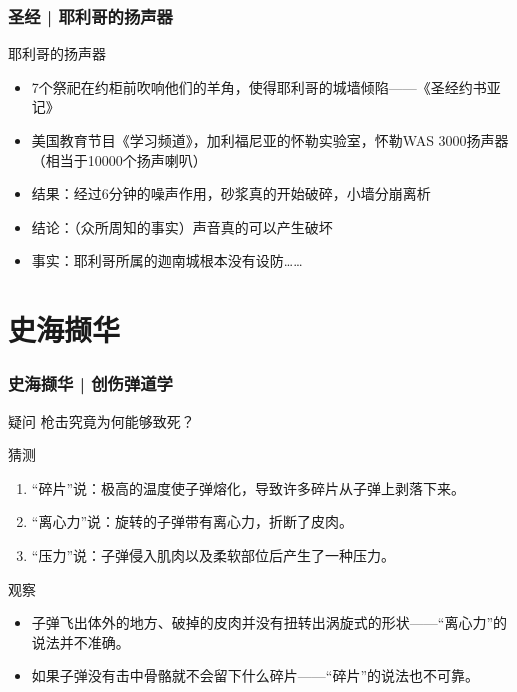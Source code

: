 \begin{frame}
  \frametitle{圣经 | 耶利哥的扬声器}
  \begin{block}{耶利哥的扬声器}
    \begin{itemize}
      \item 7个祭祀在约柜前吹响他们的羊角，使得耶利哥的城墙倾陷——《圣经\textbullet 约书亚记》
      \item 美国教育节目《学习频道》，加利福尼亚的怀勒实验室，怀勒WAS 3000扬声器（相当于10000个扬声喇叭）
      \item 结果：经过6分钟的噪声作用，砂浆真的开始破碎，小墙分崩离析
      \item 结论：（众所周知的事实）声音真的可以产生破坏
      \item 事实：耶利哥所属的迦南城根本没有设防……
    \end{itemize}
  \end{block}
\end{frame}

% 
\section{}

% 
\section{}

% 
\section{}


\section{史海撷华}
\begin{frame}
  \frametitle{史海撷华 | 创伤弹道学}
  \begin{block}{疑问}
    枪击究竟为何能够致死？
  \end{block}
  \pause
  \begin{block}{猜测}
    \begin{enumerate}
      \item “碎片”说：极高的温度使子弹熔化，导致许多碎片从子弹上剥落下来。
      \item “离心力”说：旋转的子弹带有离心力，折断了皮肉。
      \item “压力”说：子弹侵入肌肉以及柔软部位后产生了一种压力。
    \end{enumerate}
  \end{block}
  \pause
  \begin{block}{观察}
    \begin{itemize}
      \item 子弹飞出体外的地方、破掉的皮肉并没有扭转出涡旋式的形状——“离心力”的说法并不准确。
      \item 如果子弹没有击中骨骼就不会留下什么碎片——“碎片”的说法也不可靠。
    \end{itemize}
  \end{block}
\end{frame}


